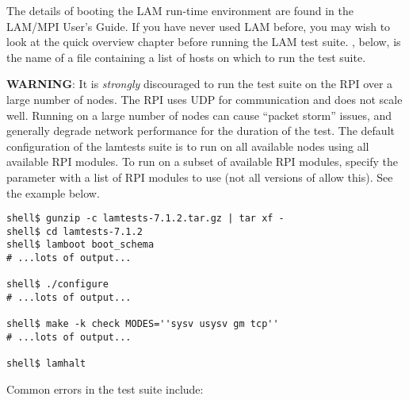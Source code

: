 The details of booting the LAM run-time environment are found in the
LAM/MPI User's Guide.  If you have never used LAM before, you may wish
to look at the quick overview chapter before running the LAM test
suite.  , below, is the name of a file containing a
list of hosts on which to run the test suite.


{\bf WARNING}: It is {\em strongly} discouraged to run the test suite
on the  RPI over a large number of nodes.  The 
RPI uses UDP for communication and does not scale well.  Running on a
large number of nodes can cause ``packet storm'' issues, and generally
degrade network performance for the duration of the test.  The default
configuration of the lamtests suite is to run on all available nodes
using all available RPI modules.  To run on a subset of available RPI
modules, specify the  parameter with a list of RPI
modules to use (not all versions of  allow this).  See the
example below.

\lstset{style=lam-shell}
\begin{lstlisting}
shell$ gunzip -c lamtests-7.1.2.tar.gz | tar xf -
shell$ cd lamtests-7.1.2
shell$ lamboot boot_schema
# ...lots of output...

shell$ ./configure
# ...lots of output...

shell$ make -k check MODES=''sysv usysv gm tcp''
# ...lots of output...

shell$ lamhalt
\end{lstlisting}

Common errors in the test suite include:

